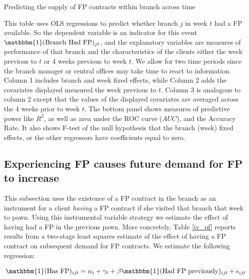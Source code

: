\begin{table}[H]
\caption{Predicting the supply of FP contracts within branch across time}
\label{instrument_random}
\begin{center}
\footnotesize{}
\end{center}
 \scriptsize
This table uses OLS regressions to predict whether branch $j$ in week $t$ had a FP available. So the dependent variable is an indicator for this event $\mathbbm{1}(\text{Branch Had FP})_{jt}$, and the explanatory variables are measures of performance of that branch and the characteristics of the clients either the week previous to $t$ or 4 weeks previous to week $t$. We allow for two time periods since the branch manager or central offices may take time to react to information. Column 1 includes branch and week fixed effects, while Column 2 adds the covariates displayed measured the week previous to $t$. Column 3 is analogous to column 2 except that the values of the displayed covariates are averaged across the 4 weeks prior to week $t$. The bottom panel shows measures of predictive power like $R^2$, as well as area under the ROC curve ($AUC$), and the Accuracy Rate. It also shows F-test of the null hypothesis that the branch (week) fixed effects, or the other regressors have coefficients equal to zero. 
\end{table}

\vspace{.1in}


\subsection{Experiencing FP causes future demand for FP to increase}

This subsection uses the existence of a FP contract in the branch as an instrument for a client \textit{having} a FP contract if she visited that branch that week to pawn. Using this instrumental variable strategy we estimate the effect of having had a FP in the previous pawn. More concretely, Table \ref{iv_pf} reports results from a two-stage least squares estimate of the effect of having a FP contract on subsequent demand for FP contracts. We estimate the following regression:

\begin{equation}
    \mathbbm{1}(\text{Has FP})_{ijt} = \alpha_i + \gamma_t + \beta \mathbbm{1}(\text{Had FP previously})_{ijt}  + \epsilon_{ijt}
    \label{eqn:IV}
\end{equation}

